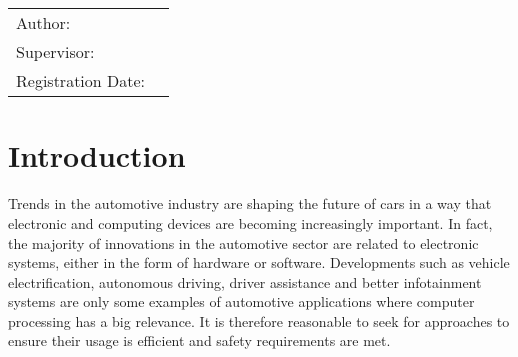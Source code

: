 
\begin{center}

{\Large\MakeUppercase{\getFaculty{}}}\\

\vspace{5mm}
{\large\MakeUppercase{\getUniversity{}}}\\

\vspace{10mm}
{\Large \getDoctype{}}

\vspace{10mm}
{\Large\bfseries \getTitle{}}

\vspace{10mm}
{\Large\bfseries \foreignlanguage{ngerman}{\getTitleGer{}}}

\vspace{15mm}
\begin{tabular}{l l}
	Author:          & \getAuthor{} \\
	Supervisor:      & \getSupervisor{} \\
	Registration Date: & \getSubmissionDate{} \\
\end{tabular}

\vspace{20mm}
\end{center}

\section*{Introduction}\label{section:introduction}
Trends in the automotive industry are shaping the future of cars in a way that electronic and computing devices are becoming increasingly important. In fact, the majority of innovations in the automotive sector are related to electronic systems, either in the form of hardware or software. Developments such as vehicle electrification, autonomous driving, driver assistance and better infotainment systems are only some examples of automotive applications where computer processing has a big relevance. It is therefore reasonable to seek for approaches to ensure their usage is efficient and safety requirements are met.

